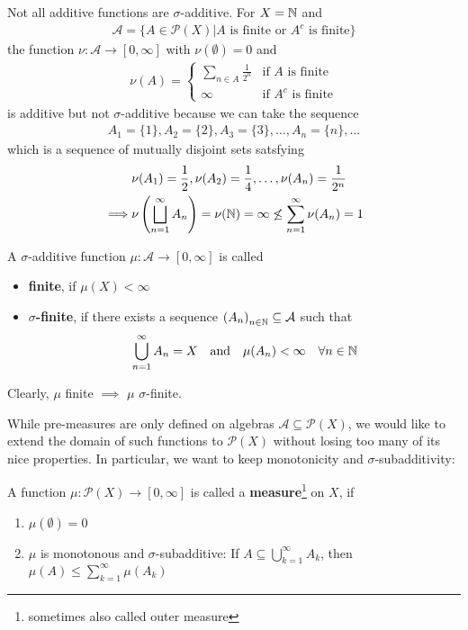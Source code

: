 \begin{ex}[]
Not all additive functions are $\sigma$-additive. 
For $X = \mathbb{N}$ and
\begin{align*}
  \mathcal{A} = \{A \in \mathcal{P}(X) \big\vert A \text{ is finite or } A^{c} \text{ is finite}\}
\end{align*}
the function $\nu: \mathcal{A} \to [0,\infty]$ with $\nu(\emptyset) = 0$ and
\begin{align*}
  \nu(A) = \left\{\begin{array}{ll}
      \underset{n \in A}{\sum} \frac{1}{2^{n}} & \text{if $A$ is finite}\\
      \infty & \text{if $A^{c}$ is finite}
  \end{array} \right.
\end{align*}
is additive but not $\sigma$-additive because we can take the sequence
\begin{align*}
  A_1 = \{1\}, A_2 = \{2\}, A_3 = \{3\}, \ldots, A_n = \{n\}, \ldots
\end{align*}
which is a sequence of mutually disjoint sets satsfying
\begin{align*}
  &\nu(A_1) = \frac{1}{2}, \nu(A_2) = \frac{1}{4}, \ldots, \nu(A_n) = \frac{1}{2^{n}} \\
  \implies 
  &\nu \left(
    \bigsqcup_{n=1}^{\infty}A_n
  \right)
  = \nu(\mathbb{N})
  = \infty \not\leq \sum_{n=1}^{\infty}\nu(A_n) = 1
\end{align*}
\end{ex}

\begin{dfn}[]
  A $\sigma$-additive function $\mu: \mathcal{A} \to [0,\infty]$ is called
    \begin{itemize}
      \item \textbf{finite}, if $\mu(X) < \infty$
      \item \textbf{$\sigma$-finite}, if there exists a sequence $\left(A_{n}\right)_{n \in \mathbb{N}} \subseteq \mathcal{A}$ such that
        \begin{align*}
          \bigcup_{n=1}^{\infty}A_n = X \quad \text{and} \quad \mu(A_n) < \infty \quad \forall n \in \mathbb{N}
        \end{align*}
    \end{itemize}
\end{dfn}
Clearly, $\mu$ finite $\implies$ $\mu$ $\sigma$-finite.

While pre-measures are only defined on algebras $\mathcal{A} \subseteq \mathcal{P}(X)$, we would like to extend the domain of such functions to $\mathcal{P}(X)$ without losing too many of its nice properties.
In particular, we want to keep monotonicity and $\sigma$-subadditivity:
\begin{dfn}[]
  A function $\mu: \mathcal{P}(X) \to [0,\infty]$ is called a \textbf{measure}\footnote{sometimes also called outer measure} on $X$, if
  \begin{enumerate}
    \item $\mu(\emptyset) = 0$
    \item $\mu$ is monotonous and $\sigma$-subadditive:
    If $A \subseteq \bigcup_{k=1}^{\infty}A_k$, then $\mu(A) \leq \sum_{k=1}^{\infty}\mu(A_k)$
  \end{enumerate}
\end{dfn}

